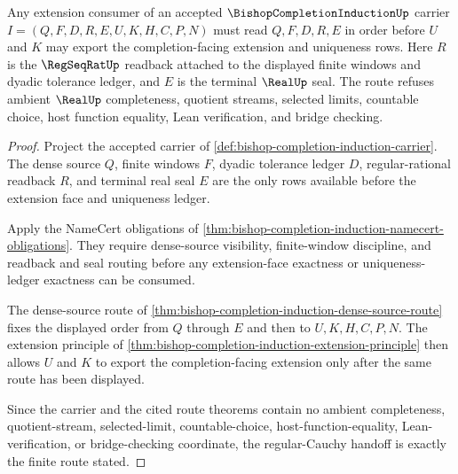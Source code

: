 \begin{theorem}
\label{thm:bishop-completion-induction-regular-cauchy-route}
Any extension consumer of an accepted $\BishopCompletionInductionUp$ carrier $I=(Q,F,D,R,E,U,K,H,C,P,N)$ must read $Q,F,D,R,E$ in order before $U$ and $K$ may export the completion-facing extension and uniqueness rows. Here $R$ is the $\RegSeqRatUp$ readback attached to the displayed finite windows and dyadic tolerance ledger, and $E$ is the terminal $\RealUp$ seal. The route refuses ambient $\RealUp$ completeness, quotient streams, selected limits, countable choice, host function equality, Lean verification, and bridge checking.
\end{theorem}
\begin{proof}
Project the accepted carrier of \autoref{def:bishop-completion-induction-carrier}. The dense source $Q$, finite windows $F$, dyadic tolerance ledger $D$, regular-rational readback $R$, and terminal real seal $E$ are the only rows available before the extension face and uniqueness ledger.

Apply the NameCert obligations of \autoref{thm:bishop-completion-induction-namecert-obligations}. They require dense-source visibility, finite-window discipline, and readback and seal routing before any extension-face exactness or uniqueness-ledger exactness can be consumed.

The dense-source route of \autoref{thm:bishop-completion-induction-dense-source-route} fixes the displayed order from $Q$ through $E$ and then to $U,K,H,C,P,N$. The extension principle of \autoref{thm:bishop-completion-induction-extension-principle} then allows $U$ and $K$ to export the completion-facing extension only after the same route has been displayed.

Since the carrier and the cited route theorems contain no ambient completeness, quotient-stream, selected-limit, countable-choice, host-function-equality, Lean-verification, or bridge-checking coordinate, the regular-Cauchy handoff is exactly the finite route stated.
\end{proof}

